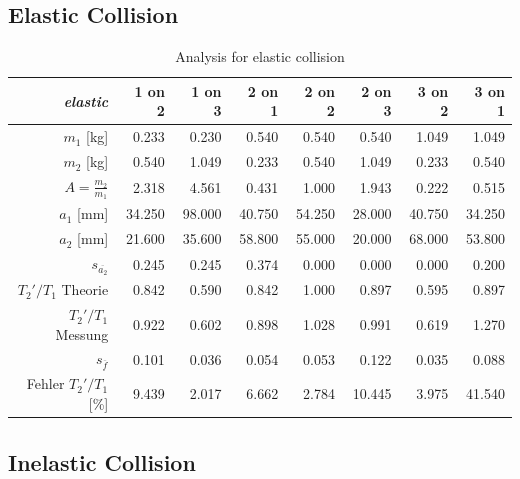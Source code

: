 \documentclass{scrreprt}
\renewcommand{\emph}[1]{\textit{#1}}
\begin{document}
\subsection{Elastic Collision}
\begin{table}[H]
\centering
\begin{tabular}{r||rrrrrrr}
 \emph{elastic} &    1 on 2 &    1 on 3 &    2 on 1 &    2 on 2 &    2 on 3 &    3 on 2 &    3 on 1 \\\hline\hline
   $m_1$ [kg] &      0.233 &      0.230 &      0.540 &      0.540 &      0.540 &      1.049 &      1.049 \\
   $m_2$ [kg] &      0.540 &      1.049 &      0.233 &      0.540 &      1.049 &      0.233 &      0.540 \\
         $A=\frac{m_2}{m_1}$ &      2.318 &      4.561 &      0.431 &      1.000 &      1.943 &      0.222 &      0.515 \\\hline
   $a_1$ [mm] &     34.250 &     98.000 &     40.750 &     54.250 &     28.000 &     40.750 &     34.250 \\
   $a_2$ [mm] &     21.600 &     35.600 &     58.800 &     55.000 &     20.000 &     68.000 &     53.800 \\
$s_{\overline{a_2}}$ &      0.245 &      0.245 &      0.374 &      0.000 &      0.000 &      0.000 &      0.200 \\\hline
$T_2'/T_1$ Theorie &      0.842 &      0.590 &      0.842 &      1.000 &      0.897 &      0.595 &      0.897 \\
$T_2'/T_1$ Messung &      0.922 &      0.602 &      0.898 &      1.028 &      0.991 &      0.619 &      1.270 \\
       $s_{\overline{f}}$ &      0.101 &      0.036 &      0.054 &      0.053 &      0.122 &      0.035 &      0.088 \\
Fehler $T_2'/T_1$ [\%] &      9.439 &      2.017 &      6.662 &      2.784 &     10.445 &      3.975 &     41.540 \\
\end{tabular}  
\caption{Analysis for elastic collision}
\label{tab:resultat1}
\end{table}

\subsection{Inelastic Collision}
\end{document}
